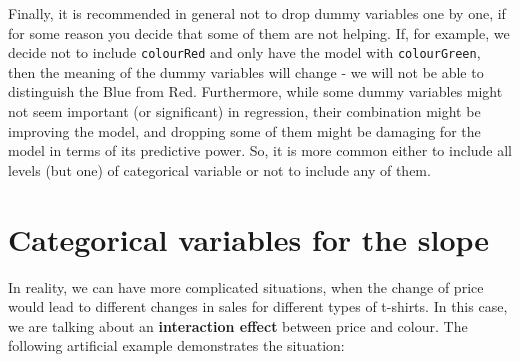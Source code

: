 \documentclass[
]{book}
\theoremstyle{definition}
\theoremstyle{definition}
\theoremstyle{definition}
\theoremstyle{definition}
\theoremstyle{remark}
\begin{document}
Finally, it is recommended in general not to drop dummy variables one by one, if for some reason you decide that some of them are not helping. If, for example, we decide not to include \texttt{colourRed} and only have the model with \texttt{colourGreen}, then the meaning of the dummy variables will change - we will not be able to distinguish the Blue from Red. Furthermore, while some dummy variables might not seem important (or significant) in regression, their combination might be improving the model, and dropping some of them might be damaging for the model in terms of its predictive power. So, it is more common either to include all levels (but one) of categorical variable or not to include any of them.

\hypertarget{categorical-variables-for-the-slope}{%
\section{Categorical variables for the slope}\label{categorical-variables-for-the-slope}}

In reality, we can have more complicated situations, when the change of price would lead to different changes in sales for different types of t-shirts. In this case, we are talking about an \textbf{interaction effect} between price and colour. The following artificial example demonstrates the situation:
\end{document}
